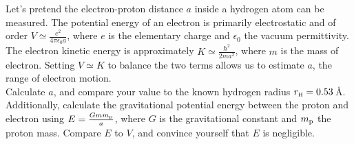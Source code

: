 \def\img{{\rm i}}
\def\ave#1{\left\langle\psi(t) \lvert {\bf #1} \rvert \psi(t)\right\rangle}
\def\comm#1#2{[{\bf #1}, {\bf #2}]}


Let's pretend the electron-proton distance $a$ 
inside a hydrogen atom can be measured.
The potential energy of an electron is primarily electrostatic 
and of order $V \simeq \frac{e^2}{4\pi \epsilon_0 a}$,
where $e$ is the elementary charge and 
$\epsilon_0$ the vacuum permittivity.
The electron kinetic energy
is approximately $K \simeq \frac{\hbar^2}{2ma^2}$,
where $m$ is the mass of electron.
Setting $V \simeq K$ to balance the two terms
allows us to estimate $a$,
the range of electron motion. \\

\noindent Calculate $a$, and compare your value to the
known hydrogen radius $r_{\rm\scriptscriptstyle H} = 0.53\,$\AA.
Additionally, calculate the gravitational potential energy 
between the proton and electron using
$E = \frac{G m m_{\rm p}}{a}$,
where $G$ is the gravitational constant and $m_{\rm p}$ the proton mass.
Compare $E$ to $V$, and convince yourself that $E$ is negligible.






